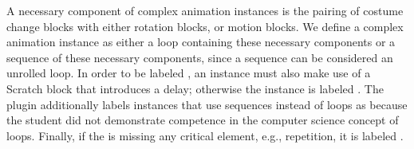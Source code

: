 A necessary component of complex animation instances is the pairing of costume
change blocks with either rotation blocks, or motion blocks. We define a
complex animation instance as either a loop containing these necessary
components or a sequence of these necessary components, since a sequence can be
considered an unrolled loop. In order to be labeled \correct{}, an instance
must also make use of a Scratch block that introduces a delay; otherwise the
instance is labeled \semincor{}. The plugin additionally labels instances that
use sequences instead of loops as \semincor{} because the student did not
demonstrate competence in the computer science concept of loops. Finally, if
the \sprogram{} is missing any critical element, e.g., repetition, it is
labeled \incom{}.
